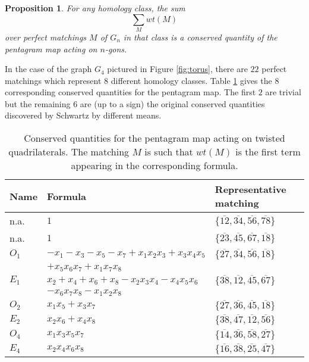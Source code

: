 \documentclass{amsart}
\newtheorem{proposition}[theorem]{Proposition}
\theoremstyle{definition}
\theoremstyle{remark}
\numberwithin{equation}{section}
\begin{document}
	\begin{proposition} \label{prop:pentagramIntegrals}
		For any homology class, the sum
		\begin{displaymath}
			\sum_M wt(M)
		\end{displaymath}
		over perfect matchings $M$ of $G_n$ in that class is a conserved quantity of the pentagram map acting on $n$-gons.	\end{proposition}
	
	In the case of the graph $G_4$ pictured in Figure \ref{fig:torus}, there are $22$ perfect matchings which represent $8$ different homology classes.  Table \ref{table:integrals} gives the $8$ corresponding conserved quantities for the pentagram map.  The first $2$ are trivial but the remaining $6$ are (up to a sign) the original conserved quantities discovered by Schwartz \cite{S08} by different means.
	
	\begin{table}[ht]
	\begin{tabular}{l|l|l}
	Name & Formula & Representative matching\\
	\hline
	n.a.  & $1$ & $\{\overline{12}, \overline{34}, \overline{56}, \overline{78}\}$\\
	n.a.  & $1$ & $\{\overline{23}, \overline{45}, \overline{67}, \overline{18}\}$\\
	$O_1$ & $-x_1-x_3-x_5-x_7+x_1x_2x_3+x_3x_4x_5$ & $\{\overline{27}, \overline{34}, \overline{56}, \overline{18}\}$ \\
	& $+x_5x_6x_7+x_1x_7x_8$ \\
	$E_1$ & $x_2+x_4+x_6+x_8-x_2x_3x_4-x_4x_5x_6$ & $\{\overline{38}, \overline{12}, \overline{45}, \overline{67}\}$ \\
	& $-x_6x_7x_8-x_1x_2x_8$ \\
	$O_2$ & $x_1x_5 + x_3x_7$ & $\{\overline{27}, \overline{36}, \overline{45}, \overline{18}\}$ \\
	$E_2$ & $x_2x_6 + x_4x_8$ & $\{\overline{38}, \overline{47}, \overline{12}, \overline{56}\}$ \\
	$O_4$ & $x_1x_3x_5x_7$ & $\{\overline{14}, \overline{36}, \overline{58}, \overline{27}\}$ \\
	$E_4$ & $x_2x_4x_6x_8$ & $\{\overline{16}, \overline{38}, \overline{25}, \overline{47}\}$ \\
	\end{tabular}
	\caption{Conserved quantities for the pentagram map acting on twisted quadrilaterals.  The matching $M$ is such that $wt(M)$ is the first term appearing in the corresponding formula.}
	\label{table:integrals}
	\end{table}
	
\end{document}

